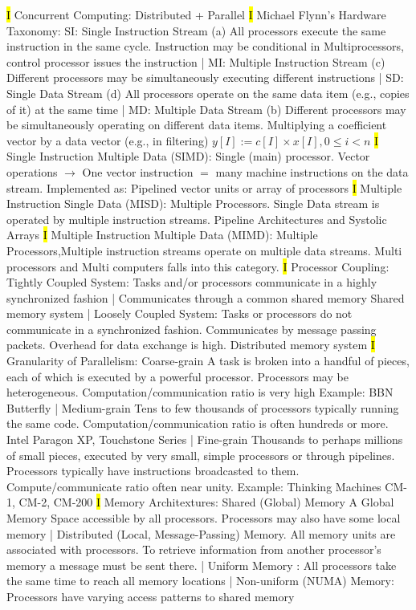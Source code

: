 \documentclass[fontsize=4pt]{scrartcl}
\begin{document}
\hl{I}
Concurrent Computing: Distributed + Parallel
\hl{I}
Michael Flynn’s Hardware Taxonomy: SI:	Single Instruction Stream (a) All processors execute the same instruction in the same cycle. Instruction may be conditional in Multiprocessors, control processor issues the instruction | MI: Multiple Instruction Stream (c) Different processors may be simultaneously executing different instructions | SD: Single Data Stream (d)
All processors operate on the same data item (e.g., copies of it) at the same time | MD: Multiple Data Stream (b) Different processors may be simultaneously operating on different data items. Multiplying a coefficient vector by a data vector (e.g., in filtering) $y[I]:=c[I] \times x[I], 0 \leq i<n$
\hl{I}
Single Instruction Multiple Data (SIMD): Single (main) processor. Vector operations $\rightarrow$ One vector instruction $=$ many machine instructions on the data stream. Implemented as: Pipelined vector units or array of processors
\hl{I}
Multiple Instruction Single Data (MISD): Multiple Processors. Single Data stream is operated by multiple instruction streams. Pipeline Architectures and Systolic Arrays
\hl{I}
Multiple Instruction Multiple Data (MIMD): Multiple Processors,Multiple instruction streams operate on multiple data streams. Multi processors and Multi computers falls into this category.
\hl{I}
Processor Coupling: Tightly Coupled System: Tasks and/or processors communicate in a highly synchronized fashion | Communicates through a common shared memory Shared memory system | Loosely Coupled System: Tasks or processors do not communicate in a synchronized fashion. Communicates by message passing packets. Overhead for data exchange is high. Distributed memory system
\hl{I}
Granularity of Parallelism: Coarse-grain A task is broken into a handful of pieces, each of which is executed by a powerful processor. Processors may be heterogeneous. Computation/communication ratio is very high Example: BBN Butterfly | Medium-grain Tens to few thousands of processors typically running the same code. Computation/communication ratio is often hundreds or more. Intel Paragon XP, Touchstone Series | Fine-grain Thousands to perhaps millions of small pieces, executed by very small, simple processors or through pipelines. Processors typically have instructions broadcasted to them. Compute/communicate ratio often near unity. Example: Thinking Machines CM-1, CM-2, CM-200
\hl{I}
Memory Architextures: Shared (Global) Memory A Global Memory Space accessible by all processors. Processors may also have some local memory | Distributed (Local, Message-Passing) Memory. All memory units are associated with processors. To retrieve information from another processor's memory a message must be sent there. | Uniform Memory : All processors take the same time to reach all memory locations | Non-uniform (NUMA) Memory: Processors have varying access patterns to shared memory
\end{document}
